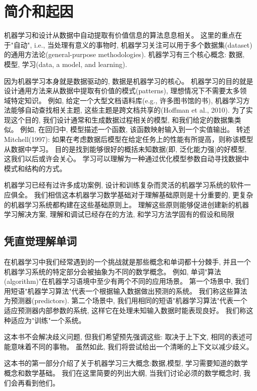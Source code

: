 \chapter{简介和起因}
机器学习和设计从数据中自动提取有价值信息的算法息息相关。
这里的重点在于"自动",
i.e., 当处理有意义的事物时, 机器学习关注可以用于多个数据集(dataset)的通用方法论(general-purpose methodologies).
机器学习有三个核心概念: 数据, 模型, 学习(data, a model, and learning).

因为机器学习本身就是数据驱动的, 数据是机器学习的核心。
机器学习的目的就是设计通用方法来从数据中提取有价值的模式(patterns), 理想情况下不需要太多领域特定知识。
例如, 给定一个大型文档语料库(e.g., 许多图书馆的书), 机器学习方法能够自动查找相关主题, 这些主题是跨文档共享的(Hoffman et al., 2010).
为了实现这个目的, 我们设计通常和生成数据过程相关的模型, 和我们给定的数据集类似。
例如, 在回归中, 模型描述一个函数, 该函数映射输入到一个实值输出。
转述Mitchell(1997): 如果在考虑数据后模型在给定任务上的性能有所提高，则称该模型从数据中学习。
目的是找到能够很好的概括未知数据(即, 泛化能力强)的好模型, 这我们以后或许会关心。
学习可以理解为一种通过优化模型参数自动寻找数据中模式和结构的方式。

机器学习已经有过许多成功案例, 设计和训练复杂而灵活的机器学习系统的软件一应俱全。
我们相信这本机器学习数学基础对于理解基础原则是十分重要的, 更复杂的机器学习系统都构建在这些基础原则上。
理解这些原则能够促进创建新的机器学习解决方案, 理解和调试已经存在的方法, 和学习方法学固有的假设和局限

\section{凭直觉理解单词}
在机器学习中我们经常遇到的一个挑战就是那些概念和单词都十分棘手,
并且一个机器学习系统的特定部分会被抽象为不同的数学概念。
例如, 单词"算法(algorithm)"在机器学习语境中至少有两个不同的应用场景。
第一个场景中, 我们用短语"机器学习算法"代表一个根据输入数据做出预测的系统。
我们称这些算法为预测器(predictors).
第二个场景中, 我们用相同的短语"机器学习算法"代表一个适应预测器内部参数的系统, 这样它在处理未知输入数据时能表现良好。
我们称这种适应为"训练"一个系统。

这本书不会解决歧义问题, 但我们希望预先强调这些: 取决于上下文, 相同的表述可能意味着不同的事物。
虽然如此, 我们将尝试给出一个清晰的上下文以减少歧义。

这本书的第一部分介绍了关于机器学习三大概念:数据,模型, 学习需要知道的数学概念和数学基础。
我们在这里简要的列出大纲, 当我们讨论必须的数学概念时, 我们会再看到他们。


